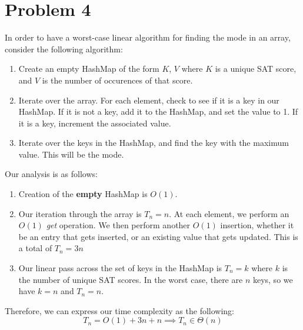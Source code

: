 \section*{Problem 4}
In order to have a worst-case linear algorithm for finding the mode in an array, consider the following algorithm:
\begin{enumerate}
    \item Create an empty HashMap of the form $K$, $V$ where $K$ is a 
    unique SAT score, and $V$ is the number of occurences of that score.
    \item Iterate over the array. For each element, check to see if it
          is a key in our HashMap.
        \subitem If it is not a key, add it to the HashMap, and set the
                 value to 1.
        \subitem If it is a key, increment the associated value.
    \item Iterate over the keys in the HashMap, and find the key with
          the maximum value. This will be the mode. 
\end{enumerate}

Our analysis is as follows:\\
\begin{enumerate}
    \item Creation of the \textbf{empty} HashMap is $O(1)$.
    \item Our iteration through the array is $T_n = n$. At each element,
          we perform an $O(1)$ \textit{get} operation. We then perform another $O(1)$ insertion, whether it be an entry that gets 
          inserted, or an existing value that gets updated. This is a 
          total of $T_n = 3n$
    \item Our linear pass across the set of keys in the HashMap is
          $T_n = k$ where $k$ is the number of unique SAT scores. In 
          the worst case, there are $n$ keys, so we have $k = n$ 
          and $T_n = n$.
\end{enumerate}
Therefore, we can express our time complexity as the following:
\\
$$
    T_n = O(1) + 3n + n \implies T_n \in \Theta(n)
$$